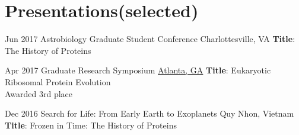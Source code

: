 \documentclass[letterpaper]{twentysecondcv}
\begin{document}
\section{Presentations\scriptsize{(selected)}}

\begin{twenty} %
\twentyitem
    	{Jun 2017}
		{}
        {Astrobiology Graduate Student Conference}
        {{Charlottesville, VA}}
        {\textbf{Title}: The History of Proteins}

	\twentyitem
    	{Apr 2017}
		{}
        {Graduate Research Symposium}
        {\href{http://www.calendar.gatech.edu/event/590513}{Atlanta, GA}}
        {\textbf{Title}: Eukaryotic Ribosomal Protein Evolution \\ Awarded 3rd place}

	\twentyitem
    	{Dec 2016}
		{}
        {Search for Life: From Early Earth to Exoplanets}
        {{Quy Nhon, Vietnam}}
        {\textbf{Title}: Frozen in Time: The History of Proteins}

\end{twenty}
\end{document}
